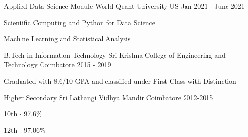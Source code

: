 

\begin{cventries}

\cventry
{Applied Data Science Module}%
{World Quant University } %
{US}%
{Jan 2021 - June 2021}%
{\begin{cvitems}
\item{Scientific Computing and Python for Data Science}
\item{Machine Learning and Statistical Analysis}
\end{cvitems}}

\end{cventries}

\begin{cventries}


\cventry
{B.Tech in Information Technology} %
{Sri Krishna College of Engineering and Technology} %
{Coimbatore} %
{2015 - 2019} %
{ %
\begin{cvitems}
\item{Graduated with 8.6/10 GPA and classified under First Class with Distinction}
\end{cvitems}
}



\end{cventries}

\begin{cventries}

\cventry
{Higher Secondary}%
{Sri Lathangi Vidhya Mandir} %
{Coimbatore}%
{2012-2015}%
{\begin{cvitems}
\item{10th - 97.6\%}
\item{12th - 97.06\%}
\end{cvitems}}

\end{cventries}
